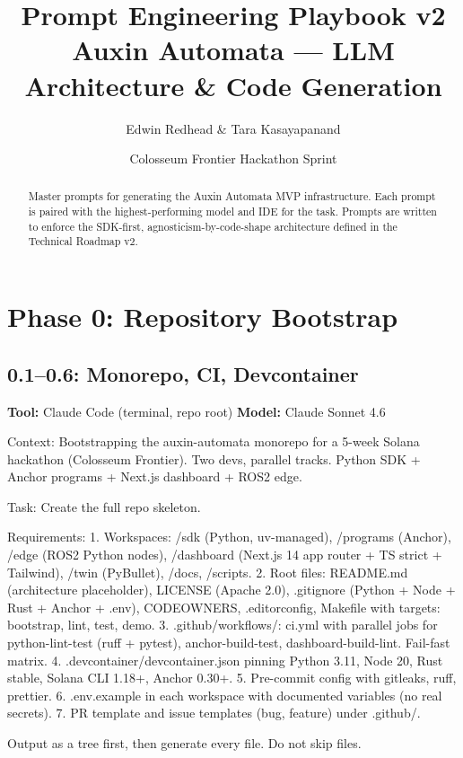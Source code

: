 \documentclass[11pt, a4paper]{article}
\title{\textbf{Prompt Engineering Playbook v2} \\ \large Auxin Automata --- LLM Architecture \& Code Generation}
\author{Edwin Redhead \& Tara Kasayapanand}
\date{Colosseum Frontier Hackathon Sprint}
\begin{document}
\maketitle

\begin{abstract}
Master prompts for generating the Auxin Automata MVP infrastructure. Each prompt is paired with the highest-performing model and IDE for the task. Prompts are written to enforce the SDK-first, agnosticism-by-code-shape architecture defined in the Technical Roadmap v2.
\end{abstract}

\vspace{1em}

\section{Phase 0: Repository Bootstrap}

\subsection*{0.1--0.6: Monorepo, CI, Devcontainer}
\textbf{Tool:} Claude Code (terminal, repo root) \quad \textbf{Model:} Claude Sonnet 4.6

\begin{promptbox}
Context: Bootstrapping the auxin-automata monorepo for a 5-week Solana hackathon (Colosseum Frontier). Two devs, parallel tracks. Python SDK + Anchor programs + Next.js dashboard + ROS2 edge.

Task: Create the full repo skeleton.

Requirements:
1. Workspaces: /sdk (Python, uv-managed), /programs (Anchor), /edge (ROS2 Python nodes), /dashboard (Next.js 14 app router + TS strict + Tailwind), /twin (PyBullet), /docs, /scripts.
2. Root files: README.md (architecture placeholder), LICENSE (Apache 2.0), .gitignore (Python + Node + Rust + Anchor + .env), CODEOWNERS, .editorconfig, Makefile with targets: bootstrap, lint, test, demo.
3. .github/workflows/: ci.yml with parallel jobs for python-lint-test (ruff + pytest), anchor-build-test, dashboard-build-lint. Fail-fast matrix.
4. .devcontainer/devcontainer.json pinning Python 3.11, Node 20, Rust stable, Solana CLI 1.18+, Anchor 0.30+.
5. Pre-commit config with gitleaks, ruff, prettier.
6. .env.example in each workspace with documented variables (no real secrets).
7. PR template and issue templates (bug, feature) under .github/.

Output as a tree first, then generate every file. Do not skip files.
\end{promptbox}
\end{document}
